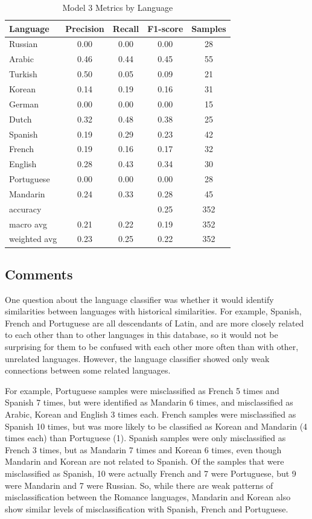 \documentclass[11pt, letterpaper]{article}
\begin{document}
\begin{table}
\begin{center}
\caption{Model 3 Metrics by Language}
\begin{tabular}{l c c c| c}
Language  &Precision &Recall &F1-score&Samples\\ \hline
Russian	&0.00	&0.00	&0.00	&28\\
Arabic	&0.46	&0.44	&0.45	&55\\     
Turkish	&0.50	&0.05	&0.09	&21\\      
Korean	&0.14	&0.19 	&0.16	&31\\      
German	&0.00	&0.00	& 0.00 	&15\\       
Dutch	&0.32	&0.48	&0.38	&25\\   
Spanish	&0.19	&0.29	&0.23	&42\\      
French	&0.19	&0.16	&0.17	&32\\    
English	&0.28	&0.43	&0.34	&30\\  
Portuguese&0.00	&0.00	&0.00	&28\\    
Mandarin	&0.24	&0.33	&0.28	&45\\ \hline
      
accuracy		&		&		&0.25	&352\\
macro avg		& 0.21	&0.22	&0.19	&352\\
weighted avg	& 0.23	&0.25	&0.22	&352\\ \hline
\end{tabular}
\label{tab:LangClassReport}
\end{center}
\end{table}

\subsection{Comments}
One question about the language classifier was whether it would identify similarities between languages with historical similarities. For example, Spanish, French and Portuguese are all descendants of Latin, and are more closely related to each other than to other languages in this database, so it would not be surprising for them to be confused with each other more often than with other, unrelated languages.  However, the language classifier showed only weak connections between some related languages.

For example, Portuguese samples were misclassified as French 5 times and Spanish 7 times, but were identified as Mandarin 6 times, and misclassified as Arabic, Korean and English 3 times each. French samples were misclassified as Spanish 10 times, but was more likely to be classified as Korean and Mandarin (4 times each) than Portuguese (1). Spanish samples were only misclassified as French 3 times, but as Mandarin 7 times and Korean 6 times, even though Mandarin and Korean are not related to Spanish. Of the samples that were misclassified as Spanish, 10 were actually French and 7 were Portuguese, but 9 were Mandarin and 7 were Russian. So, while there are weak patterns of misclassification between the Romance languages, Mandarin and Korean also show similar levels of misclassification with Spanish, French and Portuguese.
\end{document}
